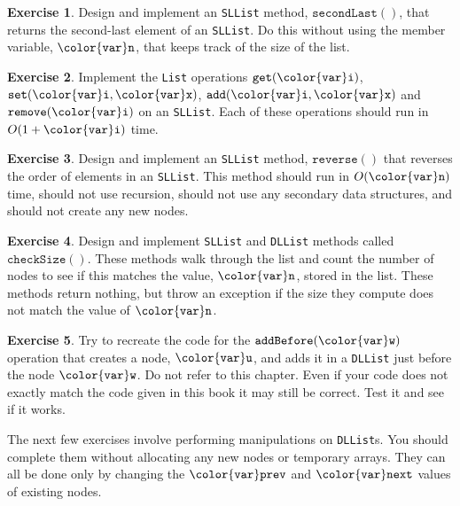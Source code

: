 \documentclass[10pt]{book}
\theoremstyle{plain}
\theoremstyle{definition}
\newtheorem{exc}{Exercise}[chapter]
\begin{document}
\begin{exc}
  Design and implement an \texttt{SLList} method, \ensuremath{\mathtt{secondLast()}}, that returns
  the second-last element of an \texttt{SLList}.  Do this without using the
  member variable, \ensuremath{\mathtt{{\color{var}n}}}, that keeps track of the size of the list.
\end{exc}

\begin{exc}
  Implement the \texttt{List} operations \ensuremath{\mathtt{get({\color{var}i})}}, \ensuremath{\mathtt{set({\color{var}i},{\color{var}x})}},
  \ensuremath{\mathtt{add({\color{var}i},{\color{var}x})}} and \ensuremath{\mathtt{remove({\color{var}i})}} on an \texttt{SLList}.  Each of these operations
  should run in $O(1+\ensuremath{\mathtt{{\color{var}i}}})$ time.
\end{exc}

\begin{exc}
  Design and implement an \texttt{SLList} method, \ensuremath{\mathtt{reverse()}} that reverses the
  order of elements in an \texttt{SLList}.  This method should run in $O(\ensuremath{\mathtt{{\color{var}n}}})$
  time, should not use recursion, should not use any secondary data
  structures, and should not create any new nodes.
\end{exc}

\begin{exc}
  Design and implement \texttt{SLList} and \texttt{DLList} methods called \ensuremath{\mathtt{checkSize()}}.
  These methods walk through the list and count the number of nodes to
  see if this matches the value, \ensuremath{\mathtt{{\color{var}n}}}, stored in the list.  These methods
  return nothing, but throw an exception if the size they compute does
  not match the value of \ensuremath{\mathtt{{\color{var}n}}}.
\end{exc}

\begin{exc}
  Try to recreate the code for the \ensuremath{\mathtt{addBefore({\color{var}w})}} operation that creates a
  node, \ensuremath{\mathtt{{\color{var}u}}}, and adds it in a \texttt{DLList} just before the node \ensuremath{\mathtt{{\color{var}w}}}.  Do not
  refer to this chapter.  Even if your code does not exactly match the
  code given in this book it may still be correct.  Test it and see if
  it works.
\end{exc}

The next few exercises involve performing manipulations on \texttt{DLList}s.
You should complete them without allocating any new nodes or temporary
arrays.  They can all be done only by changing the \ensuremath{\mathtt{{\color{var}prev}}} and \ensuremath{\mathtt{{\color{var}next}}}
values of existing nodes.
\end{document}
